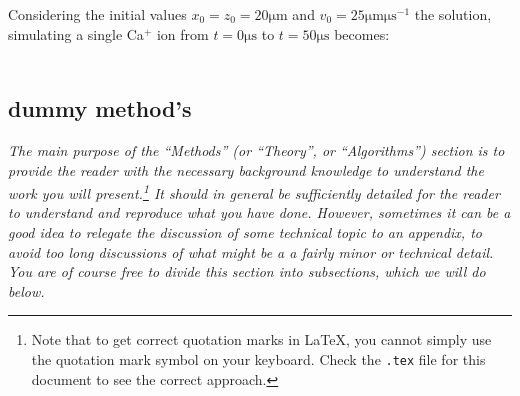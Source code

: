 \documentclass[../main_proj3.tex]{subfiles}
\begin{document}
Considering the initial values $x_0 = z_0 = 20 \mathrm{\mu m}$ and $v_0 = 25 \mathrm{\mu m \mu s^{-1}}$ the solution, simulating a single Ca$^{+}$ ion from $t=0\mathrm{\mu s}$ to $t= 50 \mathrm{\mu s}$ becomes:

\begin{equation*}
\begin{split}
    
\end{split}
\end{equation*}

\subsection{dummy method's}

\textit{The main purpose of the ``Methods'' (or ``Theory'', or ``Algorithms'') section is to provide the reader with the necessary background knowledge to understand the work you will present.\footnote{Note that to get correct quotation marks in LaTeX, you cannot simply use the quotation mark symbol on your keyboard. Check the \texttt{.tex} file for this document to see the correct approach.} It should in general be sufficiently detailed for the reader to understand and reproduce what you have done. However, sometimes it can be a good idea to relegate the discussion of some technical topic to an appendix, to avoid too long discussions of what might be a a fairly minor or technical detail. You are of course free to divide this section into subsections, which we will do below.}
\end{document}
